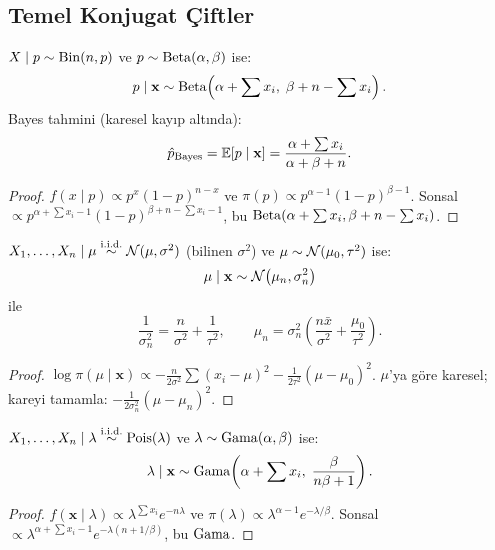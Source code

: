 \subsection{Temel Konjugat Çiftler}

\begin{teorem}\label{thm:beta_binom}
$X\mid p \sim \operatorname{Bin}(n,p)$ ve $p\sim\operatorname{Beta}(\alpha,\beta)$ ise:
\[
  p\mid\mathbf{x} \sim \operatorname{Beta}\!\left(\alpha + \sum x_i,\; \beta + n - \sum x_i\right).
\]
Bayes tahmini (karesel kayıp altında):
\[
  \hat{p}_{\text{Bayes}} = \mathbb{E}[p\mid\mathbf{x}] = \frac{\alpha+\sum x_i}{\alpha+\beta+n}.
\]
\end{teorem}

\begin{proof}
$f(x\mid p)\propto p^x(1-p)^{n-x}$ ve $\pi(p)\propto p^{\alpha-1}(1-p)^{\beta-1}$. Sonsal $\propto p^{\alpha+\sum x_i-1}(1-p)^{\beta+n-\sum x_i-1}$, bu $\operatorname{Beta}(\alpha+\sum x_i, \beta+n-\sum x_i)$.
\end{proof}

\begin{teorem}\label{thm:normal_normal}
$X_1,\ldots,X_n\mid\mu \overset{\text{i.i.d.}}{\sim} \mathcal{N}(\mu,\sigma^2)$ (bilinen $\sigma^2$) ve $\mu\sim\mathcal{N}(\mu_0,\tau^2)$ ise:
\[
  \mu\mid\mathbf{x} \sim \mathcal{N}\!\left(\mu_n, \sigma_n^2\right)
\]
ile
\[
  \frac{1}{\sigma_n^2} = \frac{n}{\sigma^2} + \frac{1}{\tau^2}, \qquad
  \mu_n = \sigma_n^2\!\left(\frac{n\bar{x}}{\sigma^2} + \frac{\mu_0}{\tau^2}\right).
\]
\end{teorem}

\begin{proof}
$\log\pi(\mu\mid\mathbf{x}) \propto -\frac{n}{2\sigma^2}\sum(x_i-\mu)^2 - \frac{1}{2\tau^2}(\mu-\mu_0)^2$. $\mu$'ya göre karesel; kareyi tamamla: $-\frac{1}{2\sigma_n^2}(\mu-\mu_n)^2$.
\end{proof}

\begin{teorem}\label{thm:gama_poisson}
$X_1,\ldots,X_n\mid\lambda\overset{\text{i.i.d.}}{\sim}\operatorname{Pois}(\lambda)$ ve $\lambda\sim\operatorname{Gama}(\alpha,\beta)$ ise:
\[
  \lambda\mid\mathbf{x} \sim \operatorname{Gama}\!\left(\alpha+\sum x_i,\; \frac{\beta}{n\beta+1}\right).
\]
\end{teorem}

\begin{proof}
$f(\mathbf{x}\mid\lambda)\propto\lambda^{\sum x_i}e^{-n\lambda}$ ve $\pi(\lambda)\propto\lambda^{\alpha-1}e^{-\lambda/\beta}$. Sonsal $\propto\lambda^{\alpha+\sum x_i-1}e^{-\lambda(n+1/\beta)}$, bu $\operatorname{Gama}$.
\end{proof}

